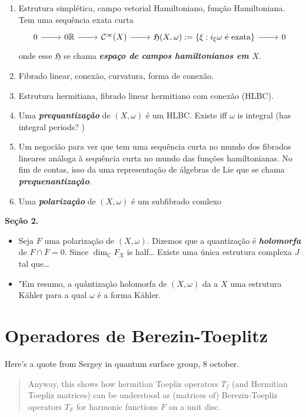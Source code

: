 \begin{enumerate}
	\item Estrutura simplética, campo vetorial Hamiltoniano, função Hamiltoniana. Tem uma sequência exata curta 
		\[\begin{tikzcd}
			0\arrow[r]&0\mathbb{R}\arrow[r]&\mathcal{C}^\infty(X)\arrow[r]&\mathfrak{H}(X,\omega):=\{\xi:i_\xi\omega\text{ é exata} \}\arrow[r]&0
		\end{tikzcd}\]
onde esse $\mathfrak{H}$ se chama \textit{\textbf{espaço de campos hamiltonianos em $X$}}.
	\item Fibrado linear, conexão, curvatura, forma de conexão.
	\item Estrutura hermitiana, fibrado linear hermitiano com conexão (HLBC).
	\item Uma \textit{\textbf{prequantização}} de $(X,\omega)$ é um HLBC. Existe iff $\omega$ is integral (has integral periods? )
	\item Um negocião para ver que tem uma sequência curta no mundo dos fibrados lineares análoga à sequência curta no mundo das funções hamiltonianas. No fim de contas, isso da uma representação de álgebras de Lie que se chama \textit{\textbf{prequenantização}}.

	 \item Uma \textit{\textbf{polarização}} de $(X,\omega)$ é um subfibrado comlexo
\end{enumerate}

{\color{4}\bfseries Seção 2.}\hspace{.5em}
\begin{itemize}
	\item Seja $F$ uma polarização de $(X,\omega)$. Dizemos que a quantização é \textit{\textbf{holomorfa}} de  $F\cap \overline{F}=0$. Since $\dim_\mathbb{C}F_X$ is half… Existe uma única estrutura complexa $J$ tal que…
\item "Em resumo, a quântização holomorfa de $(X,\omega)$ da a $X$ uma estrutura Kähler para a qual $\omega$ é a forma Kähler.
\end{itemize}

\section{Operadores de Berezin-Toeplitz}

Here's a quote from Sergey in quantum surface group, 8 october.
{\color{4}\begin{quotation}
Anyway, this shows how hermitian Toepliz operators $T_f$ (and Hermitian Toepliz matrices) can be understood as (matrices of) Berezin-Toepliz operators $T_F$ for harmonic functions $F$ on a unit disc.	
\end{quotation}}

